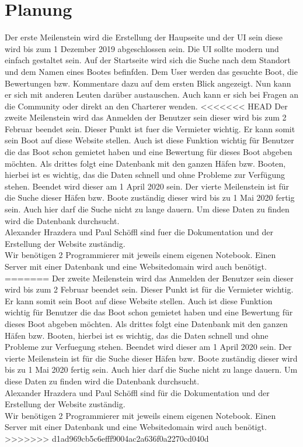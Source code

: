 \documentclass[12pt]{article}
\theoremstyle{definition}
\begin{document}
\section{Planung}
Der erste Meilenstein wird die Erstellung der Haupseite und der UI sein diese wird bis zum 1 Dezember 2019 abgeschlossen sein.
Die UI sollte modern und einfach gestaltet sein. Auf der Startseite wird sich die Suche nach dem Standort und dem Namen eines Bootes befinfden. Dem User werden das gesuchte Boot, die Bewertungen bzw. Kommentare dazu auf dem ersten Blick angezeigt. Nun kann er sich mit anderen Leuten darüber austauschen. Auch kann er sich bei Fragen an die Community oder direkt an den Charterer wenden. 
<<<<<<< HEAD
Der zweite Meilenstein wird das Anmelden der Benutzer sein dieser wird bis zum 2 Februar beendet sein. Dieser Punkt ist fuer die Vermieter wichtig. Er kann somit sein Boot auf diese Website stellen. Auch ist diese Funktion wichtig für Benutzer die das Boot schon gemietet haben und eine Bewertung für dieses Boot abgeben möchten.
Als drittes folgt eine Datenbank mit den ganzen Häfen bzw. Booten, hierbei ist es wichtig, das die Daten schnell und ohne Probleme zur Verfügung stehen. Beendet wird dieser am 1 April 2020 sein. 
Der vierte Meilenstein ist für die Suche dieser Häfen bzw. Boote zuständig dieser wird bis zu 1 Mai 2020 fertig sein. Auch hier darf die Suche nicht zu lange dauern. Um diese Daten zu finden wird die Datenbank durchsucht.
\\ Alexander Hrazdera und Paul Schöffl sind fuer die Dokumentation und der Erstellung der Website zuständig.\\ Wir benötigen 2 Programmierer mit jeweils einem eigenen Notebook. Einen Server mit einer Datenbank und eine Websitedomain wird auch benötigt.
=======
Der zweite Meilenstein wird das Anmelden der Benutzer sein dieser wird bis zum 2 Februar beendet sein. Dieser Punkt ist für die Vermieter wichtig. Er kann somit sein Boot auf diese Website stellen. Auch ist diese Funktion wichtig für Benutzer die das Boot schon gemietet haben und eine Bewertung für dieses Boot abgeben möchten.
Als drittes folgt eine Datenbank mit den ganzen Häfen bzw. Booten, hierbei ist es wichtig, das die Daten schnell und ohne Probleme zur Verfuegung stehen. Beendet wird dieser am 1 April 2020 sein. 
Der vierte Meilenstein ist für die Suche dieser Häfen bzw. Boote zuständig dieser wird bis zu 1 Mai 2020 fertig sein. Auch hier darf die Suche nicht zu lange dauern. Um diese Daten zu finden wird die Datenbank durchsucht.
\\ Alexander Hrazdera und Paul Schöffl sind für die Dokumentation und der Erstellung der Website zuständig.\\ Wir benötigen 2 Programmierer mit jeweils einem eigenen Notebook. Einen Server mit einer Datenbank und eine Websitedomain wird auch benötigt.
>>>>>>> d1ad969cb5c6efff9004ac2a636f0a2270cd040d
\end{document}
